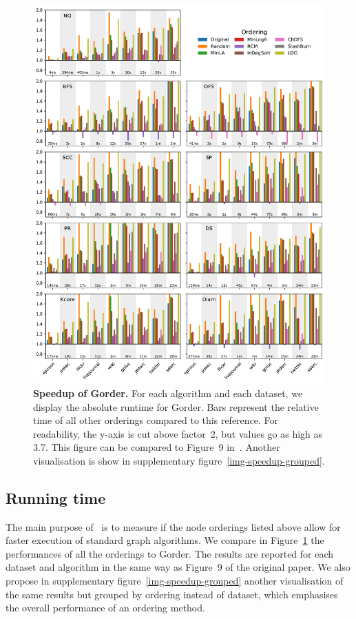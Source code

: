 \begin{figure}%
    \begin{adjustwidth}{-25mm}{-15mm}
    \centering 
    \includegraphics[width=\linewidth]{img/img-speedup.pdf}
    \caption{\textbf{Speedup of Gorder.} For each algorithm and each dataset, we display the absolute runtime for Gorder. Bars represent the relative time of all other orderings compared to this reference. For readability, the y-axis is cut above factor~2, but values go as high as 3.7. This figure can be compared to Figure~9 in~\cite{gorder}. Another visualisation is show in supplementary figure~\ref{img-speedup-grouped}.}\label{img-speedup}
    \end{adjustwidth}
\end{figure}%

\subsection{Running time}
%
The main purpose of~\cite{gorder} is to measure if the node orderings listed above allow for faster execution of standard graph algorithms.
%
We compare in Figure~\ref{img-speedup} the performances of all the orderings to Gorder. The results are reported for each dataset and algorithm in the same way as Figure~9 of the original paper.
%
We also propose in supplementary figure~\ref{img-speedup-grouped} another visualisation of the same results but grouped by ordering instead of dataset, which emphasises the overall performance of an ordering method.


